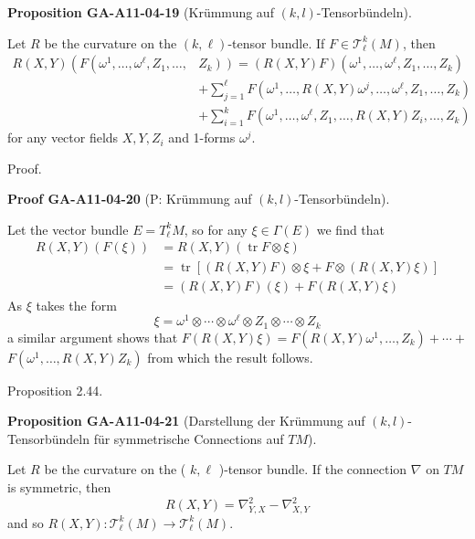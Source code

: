 \documentclass[10pt, letterpaper]{article}
\newcommand{\CustomHeading}[3]{%
  \par\medskip\noindent%
  \textbf{#1 #2} \textnormal{(#3)}.\enskip%
}
\newenvironment{PROP}[2]{\begin{unitbox}\CustomHeading{Proposition}{#1}{#2}}{\end{unitbox}}
\newenvironment{PROOF}[2]{\begin{unitbox}\CustomHeading{Proof}{#1}{#2}}{\end{unitbox}}
\begin{document}
\begin{PROP}{GA-A11-04-19}{Krümmung auf $(k,l)$-Tensorbündeln}
Let $R$ be the curvature on the $(k, \ell)$-tensor bundle. If $F \in \mathscr{T}_{\ell}^{k}(M)$, then
$$
\begin{aligned}
R(X, Y)\left(F \left(\omega^{1}, \ldots, \omega^{\ell}, Z_{1}, \ldots,\right.\right. & \left.\left.Z_{k}\right)\right)=(R(X, Y) F)\left(\omega^{1}, \ldots, \omega^{\ell}, Z_{1}, \ldots, Z_{k}\right) \\
& +\sum_{j=1}^{\ell} F\left(\omega^{1}, \ldots, R(X, Y) \omega^{j}, \ldots, \omega^{\ell}, Z_{1}, \ldots, Z_{k}\right) \\
& +\sum_{i=1}^{k} F\left(\omega^{1}, \ldots, \omega^{\ell}, Z_{1}, \ldots, R(X, Y) Z_{i}, \ldots, Z_{k}\right)
\end{aligned}
$$
for any vector fields $X, Y, Z_{i}$ and 1-forms $\omega^{j}$.
\end{PROP}



Proof. 


\begin{PROOF}{GA-A11-04-20}{P: Krümmung auf $(k,l)$-Tensorbündeln}
Let the vector bundle $E=T_{\ell}^{k} M$, so for any $\xi \in \Gamma(E)$ we find that
$$
\begin{aligned}
R(X, Y)(F(\xi)) & =R(X, Y)(\operatorname{tr} F \otimes \xi) \\
& =\operatorname{tr}[(R(X, Y) F) \otimes \xi+F \otimes(R(X, Y) \xi)] \\
& =(R(X, Y) F)(\xi)+F(R(X, Y) \xi)
\end{aligned}
$$
As $\xi$ takes the form
$$
\xi=\omega^{1} \otimes \cdots \otimes \omega^{\ell} \otimes Z_{1} \otimes \cdots \otimes Z_{k}
$$
a similar argument shows that $F(R(X, Y) \xi)=F\left(R(X, Y) \omega^{1}, \ldots, Z_{k}\right)+\cdots+$ $F\left(\omega^{1}, \ldots, R(X, Y) Z_{k}\right)$ from which the result follows.
\end{PROOF}


Proposition 2.44. 


\begin{PROP}{GA-A11-04-21}{Darstellung der Krümmung auf $(k,l)$-Tensorbündeln für symmetrische Connections auf $TM$}
Let $R$ be the curvature on the ( $k, \ell$ )-tensor bundle. If the connection $\nabla$ on $T M$ is symmetric, then
$$
R(X, Y)=\nabla_{Y, X}^{2}-\nabla_{X, Y}^{2}
$$
and so $R(X, Y): \mathscr{T}_{\ell}^{k}(M) \rightarrow \mathscr{T}_{\ell}^{k}(M)$.
\end{PROP}
\end{document}
